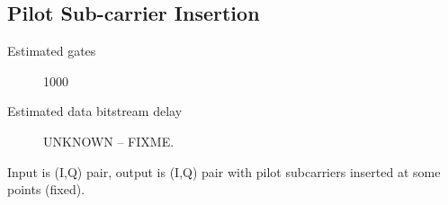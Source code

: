 

\subsection{Pilot Sub-carrier Insertion}
\label{sec:pilot}
\begin{description}
	\item[Estimated gates] 1000
	\item[Estimated data bitstream delay] UNKNOWN -- FIXME.
\end{description}

Input is (I,Q) pair, output is (I,Q) pair with pilot subcarriers
inserted at some points (fixed).



